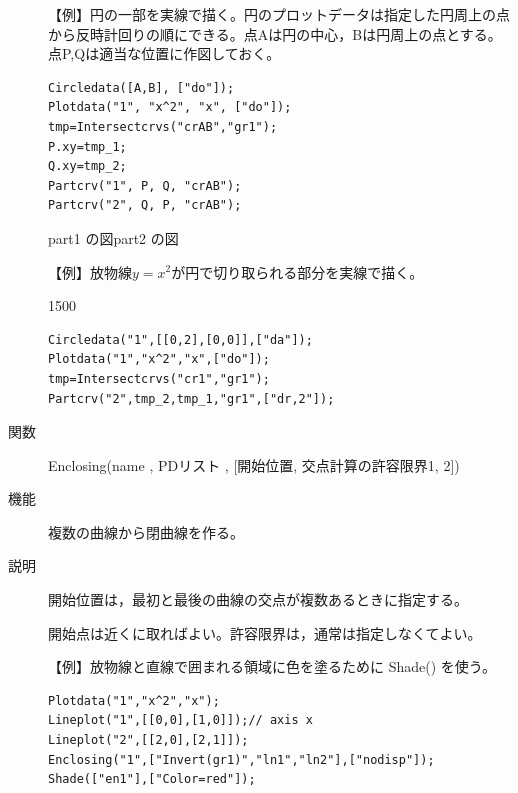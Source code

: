 \documentclass[papersize,a4paper,12pt,uplatex]{jsarticle}
\begin{document}
\begin{description}
【例】円の一部を実線で描く。円のプロットデータは指定した円周上の点から反時計回りの順にできる。点Aは円の中心，Bは円周上の点とする。点P,Qは適当な位置に作図しておく。
\begin{verbatim}
Circledata([A,B], ["do"]);
Plotdata("1", "x^2", "x", ["do"]);
tmp=Intersectcrvs("crAB","gr1");
P.xy=tmp_1;
Q.xy=tmp_2;
Partcrv("1", P, Q, "crAB");
Partcrv("2", Q, P, "crAB");
\end{verbatim}
\vspace{\baselineskip}
\hspace{10mm}  \hspace{10mm}  
 
\hspace{25mm}part1 の図\hspace{45mm}part2 の図

\vspace{\baselineskip}
【例】放物線$y=x^2$が円で切り取られる部分を実線で描く。

\begin{layer}{150}{0}
\end{layer}
\begin{verbatim}
Circledata("1",[[0,2],[0,0]],["da"]);
Plotdata("1","x^2","x",["do"]);
tmp=Intersectcrvs("cr1","gr1");
Partcrv("2",tmp_2,tmp_1,"gr1",["dr,2"]);

\end{verbatim}

\vspace{\baselineskip}
\vspace{\baselineskip}
\vspace{\baselineskip}


\vspace{\baselineskip}
\hypertarget{enclosing}{}
\item[関数]Enclosing(name , PDリスト , [開始位置, 交点計算の許容限界1, 2])
\item[機能]複数の曲線から閉曲線を作る。
\item[説明]開始位置は，最初と最後の曲線の交点が複数あるときに指定する。

開始点は近くに取ればよい。許容限界は，通常は指定しなくてよい。

\vspace{\baselineskip}
【例】放物線と直線で囲まれる領域に色を塗るために Shade() を使う。
\begin{verbatim}
Plotdata("1","x^2","x");
Lineplot("1",[[0,0],[1,0]]);// axis x
Lineplot("2",[[2,0],[2,1]]);
Enclosing("1",["Invert(gr1)","ln1","ln2"],["nodisp"]);
Shade(["en1"],["Color=red"]);
\end{verbatim}
\vspace{\baselineskip}
 \begin{center}  \end{center}


\end{description}
\end{document}
